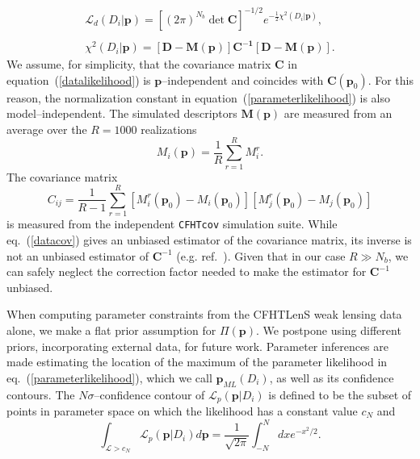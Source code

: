 \documentclass[reprint,aps,prd,superscriptaddress,showkeys,showpacs]{revtex4-1}
\begin{document}
\begin{equation}
\label{datalikelihood}
\begin{matrix}
\mathcal{L}_d(D_i\vert \mathbf{p}) = [(2\pi)^{N_b}\det{\mathbf{C}}]^{-1/2} e^{-\frac{1}{2}\chi^2(D_i\vert \mathbf{p})}, \\ \\
\chi^2(D_i\vert \mathbf{p}) = \mathbf{[D - M(p)]C^{-1}[D-M(p)]}.
\end{matrix}
\end{equation} 
%
We assume, for simplicity, that the covariance matrix $\mathbf{C}$ in
equation~(\ref{datalikelihood}) is $\mathbf{p}$--independent and
coincides with $\mathbf{C}(\mathbf{p}_0)$. For this reason, the
normalization constant in equation~(\ref{parameterlikelihood}) is also
model--independent. The simulated descriptors $\mathbf{M(p)}$ are
measured from an average over the $R=1000$ realizations
\begin{equation}
M_i(\mathbf{p}) = \frac{1}{R}\sum_{r=1}^R M_i^r .
\end{equation}
%
The covariance matrix 
\begin{equation}
\label{datacov}
C_{ij} = \frac{1}{R-1} \sum_{r=1}^R [M_i^r(\mathbf{p}_0)-M_i(\mathbf{p}_0)][M_j^r(\mathbf{p}_0)-M_j(\mathbf{p}_0)]
\end{equation}
%
is measured from the independent \texttt{CFHTcov} simulation suite.
While eq.~(\ref{datacov}) gives an unbiased estimator of the
covariance matrix, its inverse is not an unbiased estimator of
$\mathbf{C}^{-1}$ (e.g. ref.~\citep{RayTracingHartlap}). Given that in
our case $R\gg N_b$, we can safely neglect the correction factor
needed to make the estimator for $\mathbf{C}^{-1}$ unbiased.

When computing parameter constraints from the CFHTLenS weak lensing
data alone, we make a flat prior assumption for $\Pi(\mathbf{p})$.  We
postpone using different priors, incorporating external data, for
future work. Parameter inferences are made estimating the location of
the maximum of the parameter likelihood in
eq.~(\ref{parameterlikelihood}), which we call $\mathbf{p}_{ML}(D_i)$,
as well as its confidence contours. The $N\sigma$--confidence contour
of $\mathcal{L}_p(\mathbf{p}\vert D_i)$ is defined to be the subset of
points in parameter space on which the likelihood has a constant value
$c_N$ and
\begin{equation}
\label{ennesigma}
\int_{\mathcal{L}>c_N} \mathcal{L}_p(\mathbf{p}\vert D_i) d\mathbf{p} = \frac{1}{\sqrt{2\pi}}\int_{-N}^N dx e^{-x^2/2}.
\end{equation}
%
\end{document}

